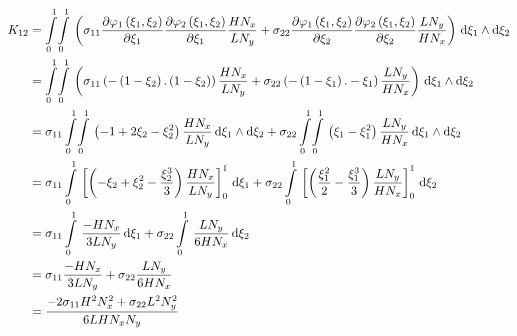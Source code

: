 \begin{equation}
  \begin{aligned}
    K_{12}&=\giint{0}{1}{0}{1}{\pbrac{\sigma_{11}\delby{\lbfn{1}{\xi_{1},\xi_{2}}}{\xi_{1}}\delby{\lbfn{2}{\xi_{1},\xi_{2}}}{\xi_{1}}
        \dfrac{H N_{x}}{L N_{y}}+\sigma_{22}\delby{\lbfn{1}{\xi_{1},\xi_{2}}}{\xi_{2}}\delby{\lbfn{2}{\xi_{1},\xi_{2}}}{\xi_{2}}
        \dfrac{L N_{y}}{H N_{x}}}}{\xi_{1}}{\xi_{2}}\\
    &=\giint{0}{1}{0}{1}{\pbrac{\sigma_{11}\pbrac{-\pbrac{1-\xi_{2}}.\pbrac{1-\xi_{2}}}\dfrac{H N_{x}}{L N_{y}}+
    \sigma_{22}\pbrac{-\pbrac{1-\xi_{1}}.-\xi_{1}}\dfrac{L N_{y}}{H N_{x}}}}{\xi_{1}}{\xi_{2}} \\
    &=\sigma_{11}\giint{0}{1}{0}{1}{\pbrac{-1+2\xi_{2}-\xi_{2}^{2}}\dfrac{H N_{x}}{L N_{y}}}{\xi_{1}}{\xi_{2}}+
    \sigma_{22}\giint{0}{1}{0}{1}{\pbrac{\xi_{1}-\xi_{1}^{2}}\dfrac{L N_{y}}{H N_{x}}}{\xi_{1}}{\xi_{2}} \\
    &=\sigma_{11}\gint{0}{1}{\sqbrac{\pbrac{-\xi_{2}+\xi_{2}^{2}-\dfrac{\xi_{2}^{3}}{3}}\dfrac{H N_{x}}{L N_{y}}}_{0}^{1}}{\xi_{1}}+
    \sigma_{22}\gint{0}{1}{\sqbrac{\pbrac{\dfrac{\xi_{1}^{2}}{2}-\dfrac{\xi_{1}^{3}}{3}}\dfrac{L N_{y}}{H N_{x}}}_{0}^{1}}{\xi_{2}} \\
    &=\sigma_{11}\gint{0}{1}{\dfrac{-H N_{x}}{3 L N_{y}}}{\xi_{1}}+\sigma_{22}\gint{0}{1}{\dfrac{L N_{y}}{6 H N_{x}}}{\xi_{2}} \\
    &=\sigma_{11}\dfrac{-H N_{x}}{3 L N_{y}}+\sigma_{22}\dfrac{L N_{y}}{6 H N_{x}} \\
    &=\dfrac{-2\sigma_{11}H^{2}N_{x}^{2}+\sigma_{22}L^{2}N_{y}^{2}}{6 L H N_{x} N_{y}}
  \end{aligned}
\end{equation}

